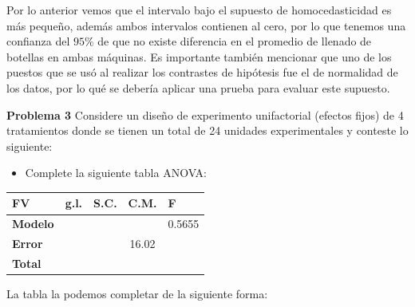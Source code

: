 \documentclass[a4paper]{scrartcl}\usepackage[]{graphicx}\usepackage[]{color}
\begin{document}
\noindent Por lo anterior vemos que el intervalo bajo el supuesto de homocedasticidad es más pequeño, además ambos intervalos contienen al cero, por lo que tenemos una confianza del $95\%$ de que no existe diferencia en el promedio de llenado de botellas en ambas máquinas. Es importante también mencionar que uno de los puestos que se usó al realizar los contrastes de hipótesis fue el de normalidad de los datos, por lo qué se debería aplicar una prueba para evaluar este supuesto.

\newpage
\textbf{Problema 3}
Considere un diseño de experimento unifactorial (efectos fijos) de 4 tratamientos donde se tienen un total de 24 unidades experimentales y conteste lo siguiente:

\begin{itemize}
  \item Complete la siguiente tabla ANOVA:
\end{itemize}

\begin{table}[h]
\centering
\begin{adjustbox}{max width=\textwidth}
\begin{tabular}{|l|c|ccc}
\hline
\rowcolor[HTML]{C0C0C0} 
\textbf{FV} & \multicolumn{1}{l|}{\cellcolor[HTML]{C0C0C0}\textbf{g.l.}} & \multicolumn{1}{l|}{\cellcolor[HTML]{C0C0C0}\textbf{S.C.}} & \multicolumn{1}{l|}{\cellcolor[HTML]{C0C0C0}\textbf{C.M.}} & \multicolumn{1}{l|}{\cellcolor[HTML]{C0C0C0}\textbf{F}} \\ \hline
\cellcolor[HTML]{C0C0C0}\textbf{Modelo} &  & \multicolumn{1}{c|}{} & \multicolumn{1}{c|}{} & \multicolumn{1}{c|}{0.5655} \\ \hline
\cellcolor[HTML]{C0C0C0}\textbf{Error} &  & \multicolumn{1}{c|}{} & \multicolumn{1}{c|}{16.02} &  \\ \cline{1-4}
\cellcolor[HTML]{C0C0C0}\textbf{Total} &  &  &  &  \\ \cline{1-2}
\end{tabular}
\end{adjustbox}
\end{table}

\noindent La tabla la podemos completar de la siguiente forma:\\
\end{document}
